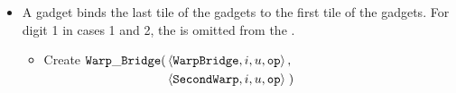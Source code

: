 \begin{itemize}
\begin{itemize}
        \end{itemize}
        \vspace{.5cm}

        \item A {\warpbridge} gadget binds the last tile of the {\firstwarp} gadgets to the
             first tile of the {\secondwarp} gadgets. For digit 1 in cases 1 and 2, the
             {\warpbridge} is omitted from the {\warpunit}.

        \begin{itemize}
            \item Create
            $\begin{aligned}[t]
                {\tt Warp\_Bridge}(& \left\langle {\tt WarpBridge}, i, u, {\tt op} \right\rangle, \\
                            & \left\langle {\tt SecondWarp}, i, u, {\tt op} \right\rangle \;)
            \end{aligned}$
            \vspace{.5cm}
        \end{itemize}


\end{itemize}
